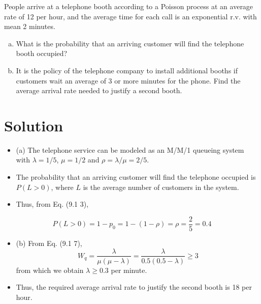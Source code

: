 \documentclass[a4paper12pt]{article}
\begin{document}
\large 






People arrive at a telephone booth according to a Poisson process at an average rate of 12 per 
hour, and the average time for each call is an exponential r.v. with mean 2 minutes. 

\begin{enumerate}[(a)]
    \item  What is the probability that an arriving customer will find the telephone booth occupied? 
\item It is the policy of the telephone company to install additional booths if customers wait an 
average of 3 or more minutes for the phone. Find the average arrival rate needed to justify a 
second booth. 
\end{enumerate}

\section*{Solution}
\begin{itemize}
    \item (a) The telephone service can be modeled as an M/M/1 queueing system with $\lambda = 1/5$, $\mu = 1/2$ and $\rho = \lambda / \mu = 2/5$.
\item The probability that an arriving customer will find the telephone occupied is $P(L > 0)$, where 
$L$ is the average number of customers in the system. 
\item Thus, from Eq. (9.1 3), 
\end{itemize}
\[P(L>0) = 1-p_{0} = 1-(1-\rho) = \rho = \frac{2}{5} = 0.4 \]
\begin{itemize}
    \item (b) From Eq. (9.1 7), 
    \[ W_{q} = \frac{\lambda}{\mu(\mu-\lambda)} = \frac{\lambda}{0.5(0.5-\lambda)} \geq 3\]
from which we obtain $\lambda \geq 0.3$ per minute.
\item Thus, the required average arrival rate to justify the second 
booth is 18 per hour.
\end{itemize}

 
\end{document}
